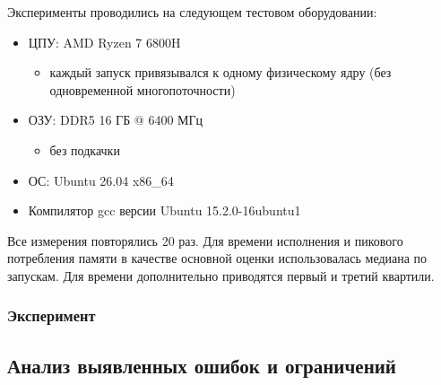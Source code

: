 Эксперименты проводились на следующем тестовом оборудовании:
  \begin{itemize}
    \item ЦПУ: AMD Ryzen 7 6800H
    \begin{itemize}
      \item каждый запуск привязывался к одному физическому ядру (без одновременной многопоточности)
    \end{itemize}
    \item ОЗУ: DDR5 16 ГБ @ 6400 МГц
    \begin{itemize}
      \item без подкачки
    \end{itemize}
    \item ОС: Ubuntu 26.04 x86\_64
    \item Компилятор gcc версии Ubuntu 15.2.0-16ubuntu1
  \end{itemize}

Все измерения повторялись 20 раз. Для времени исполнения и пикового
  потребления памяти в качестве основной оценки использовалась медиана по
  запускам. Для времени дополнительно приводятся первый и третий квартили.

\label{subsec:performance-methodology}

\subsubsection{Эксперимент}




\subsection{Анализ выявленных ошибок и ограничений}
\label{subsec:testing-limitations}

